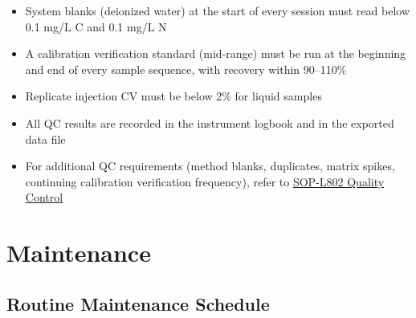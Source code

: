 \documentclass[
  11pt,
  letterpaper,
]{article}
\providecommand{\tightlist}{%
  \setlength{\itemsep}{0pt}\setlength{\parskip}{0pt}}
\begin{document}
\begin{itemize}
\tightlist
\item
  System blanks (deionized water) at the start of every session must
  read below 0.1 mg/L C and 0.1 mg/L N
\item
  A calibration verification standard (mid-range) must be run at the
  beginning and end of every sample sequence, with recovery within
  90--110\%
\item
  Replicate injection CV must be below 2\% for liquid samples
\item
  All QC results are recorded in the instrument logbook and in the
  exported data file
\item
  For additional QC requirements (method blanks, duplicates, matrix
  spikes, continuing calibration verification frequency), refer to
  \href{SOP-L802-quality-control.qmd}{SOP-L802 Quality Control}
\end{itemize}

\section{Maintenance}\label{maintenance}

\subsection{Routine Maintenance
Schedule}\label{routine-maintenance-schedule}
\end{document}

